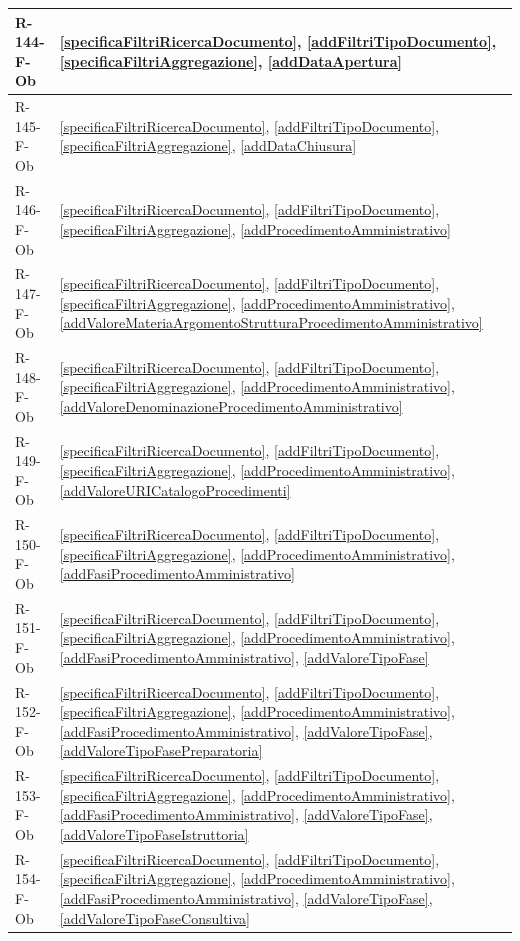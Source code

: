 \begin{longtable}{|p{4cm}|p{10cm}|}
\hline
R-144-F-Ob & \ref{specificaFiltriRicercaDocumento}, \ref{addFiltriTipoDocumento}, \ref{specificaFiltriAggregazione}, \ref{addDataApertura} \\
\hline
R-145-F-Ob & \ref{specificaFiltriRicercaDocumento}, \ref{addFiltriTipoDocumento}, \ref{specificaFiltriAggregazione}, \ref{addDataChiusura} \\
\hline
R-146-F-Ob & \ref{specificaFiltriRicercaDocumento}, \ref{addFiltriTipoDocumento}, \ref{specificaFiltriAggregazione}, \ref{addProcedimentoAmministrativo} \\
\hline
R-147-F-Ob & \ref{specificaFiltriRicercaDocumento}, \ref{addFiltriTipoDocumento}, \ref{specificaFiltriAggregazione}, \ref{addProcedimentoAmministrativo}, \ref{addValoreMateriaArgomentoStrutturaProcedimentoAmministrativo} \\
\hline
R-148-F-Ob & \ref{specificaFiltriRicercaDocumento}, \ref{addFiltriTipoDocumento}, \ref{specificaFiltriAggregazione}, \ref{addProcedimentoAmministrativo}, \ref{addValoreDenominazioneProcedimentoAmministrativo} \\
\hline
R-149-F-Ob & \ref{specificaFiltriRicercaDocumento}, \ref{addFiltriTipoDocumento}, \ref{specificaFiltriAggregazione}, \ref{addProcedimentoAmministrativo}, \ref{addValoreURICatalogoProcedimenti} \\
\hline
R-150-F-Ob & \ref{specificaFiltriRicercaDocumento}, \ref{addFiltriTipoDocumento}, \ref{specificaFiltriAggregazione}, \ref{addProcedimentoAmministrativo}, \ref{addFasiProcedimentoAmministrativo} \\
\hline
R-151-F-Ob & \ref{specificaFiltriRicercaDocumento}, \ref{addFiltriTipoDocumento}, \ref{specificaFiltriAggregazione}, \ref{addProcedimentoAmministrativo}, \ref{addFasiProcedimentoAmministrativo}, \ref{addValoreTipoFase} \\
\hline
R-152-F-Ob & \ref{specificaFiltriRicercaDocumento}, \ref{addFiltriTipoDocumento}, \ref{specificaFiltriAggregazione}, \ref{addProcedimentoAmministrativo}, \ref{addFasiProcedimentoAmministrativo}, \ref{addValoreTipoFase}, \ref{addValoreTipoFasePreparatoria} \\
\hline
R-153-F-Ob & \ref{specificaFiltriRicercaDocumento}, \ref{addFiltriTipoDocumento}, \ref{specificaFiltriAggregazione}, \ref{addProcedimentoAmministrativo}, \ref{addFasiProcedimentoAmministrativo}, \ref{addValoreTipoFase}, \ref{addValoreTipoFaseIstruttoria} \\
\hline
R-154-F-Ob & \ref{specificaFiltriRicercaDocumento}, \ref{addFiltriTipoDocumento}, \ref{specificaFiltriAggregazione}, \ref{addProcedimentoAmministrativo}, \ref{addFasiProcedimentoAmministrativo}, \ref{addValoreTipoFase}, \ref{addValoreTipoFaseConsultiva} \\

\end{longtable}
